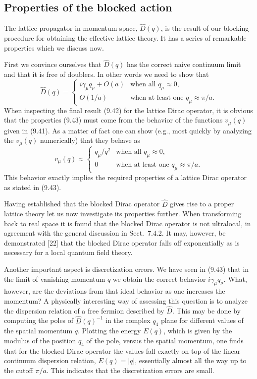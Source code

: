 \subsection{Properties of the blocked action}
\label{sec:9.2.3}

The lattice propagator in momentum space, $\hat D(q)$, is the result of our
blocking procedure for obtaining the effective lattice theory. It has a series
of remarkable properties which we discuss now.

First we convince ourselves that $\hat D(q)$ has the correct naive continuum
limit and that it is free of doublers. In other words we need to show that
\begin{equation}
  \hat D(q) = \begin{cases}
    i\gamma_\mu q_\mu + O(a) & \text{when all } q_\mu \approx 0 ,\\
    O(1/a) & \text{when at least one } q_\mu \approx \pi/a .
  \end{cases}
\end{equation}
When inspecting the final result (9.42) for the lattice Dirac operator, it is
obvious that the properties (9.43) must come from the behavior of the
functions $v_\mu(q)$ given in (9.41). As a matter of fact one can show (e.g.,
most quickly by analyzing the $v_\mu(q)$ numerically) that they behave as
\begin{equation}
  v_\mu(q) \approx \begin{cases}
    q_\mu/q^2 & \text{when all } q_\mu \approx 0 ,\\
    0 & \text{when at least one } q_\mu \approx \pi/a .
  \end{cases}
\end{equation}
This behavior exactly implies the required properties of a lattice Dirac
operator as stated in (9.43).

Having established that the blocked Dirac operator $\hat D$ gives rise to a
proper lattice theory let us now investigate its properties further. When
transforming back to real space it is found that the blocked Dirac operator is
not ultralocal, in agreement with the general discussion in Sect.~7.4.2. It
may, however, be demonstrated [22] that the blocked Dirac operator falls off
exponentially as is necessary for a local quantum field theory.

Another important aspect is discretization errors. We have seen in (9.43) that
in the limit of vanishing momentum $q$ we obtain the correct behavior
$i\gamma_\mu q_\mu$. What, however, are the deviations from that ideal behavior
as one increases the momentum? A physically interesting way of assessing this
question is to analyze the dispersion relation of a free fermion described by
$\hat D$. This may be done by computing the poles of $\hat D(q)^{-1}$ in the
complex $q_4$ plane for different values of the spatial momentum $q$. Plotting
the energy $E(q)$, which is given by the modulus of the position $q_4$ of the
pole, versus the spatial momentum, one finds that for the blocked Dirac
operator the values fall exactly on top of the linear continuum dispersion
relation, $E(q) = |q|$, essentially almost all the way up to the cutoff
$\pi/a$. This indicates that the discretization errors are small.

